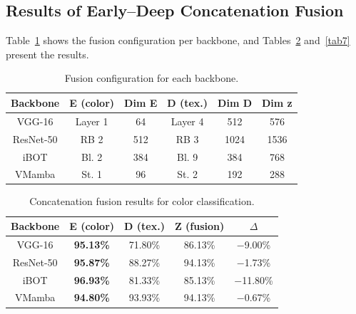 \documentclass[letterpaper, 10 pt, conference]{ieeeconf}
\begin{document}
\subsection{Results of Early--Deep Concatenation Fusion}

Table~\ref{tab5} shows the fusion configuration per backbone, and
Tables~\ref{tab6} and~\ref{tab7} present the results.

\begin{table}[htbp]
\caption{Fusion configuration for each backbone.}
\begin{center}
\begin{tabular}{c|c|c|c|c|c}
\hline
\textbf{Backbone} & \textbf{E (color)} & \textbf{Dim E}
                  & \textbf{D (tex.)} & \textbf{Dim D} & \textbf{Dim z} \\
\hline
VGG-16    & Layer 1 & 64  & Layer 4 & 512  & 576  \\
ResNet-50 & RB 2    & 512 & RB 3    & 1024 & 1536 \\
iBOT      & Bl. 2   & 384 & Bl. 9   & 384  & 768  \\
VMamba    & St. 1   & 96  & St. 2   & 192  & 288  \\
\hline
\end{tabular}
\label{tab5}
\end{center}
\end{table}

\begin{table}[htbp]
\caption{Concatenation fusion results for color classification.}
\begin{center}
\begin{tabular}{c|c|c|c|c}
\hline
\textbf{Backbone} & \textbf{E (color)} & \textbf{D (tex.)}
                  & \textbf{Z (fusion)} & \textbf{$\Delta$} \\
\hline
VGG-16    & \textbf{95.13\%} & 71.80\% & 86.13\% & $-$9.00\%  \\
ResNet-50 & \textbf{95.87\%} & 88.27\% & 94.13\% & $-$1.73\%  \\
iBOT      & \textbf{96.93\%} & 81.33\% & 85.13\% & $-$11.80\% \\
VMamba    & \textbf{94.80\%} & 93.93\% & 94.13\% & $-$0.67\%  \\
\hline
\end{tabular}
\label{tab6}
\end{center}
\end{table}
\end{document}
